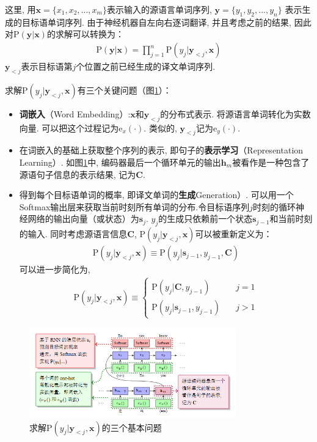 \documentclass[a4paper]{article}
\theoremstyle{definition}
\numberwithin{equation}{section}
\newcommand{\parinterval}{\noindent\hspace{2em}}%
\begin{document}
\noindent 这里, 用$\mathbf{x}=\{ x_1, x_2, ...,  x_m \}$表示输入的源语言单词序列, $\mathbf{y}=\{ y_1, y_2, ...,  y_n \}$ 表示生成的目标语单词序列. 由于神经机器自左向右逐词翻译, 并且考虑之前的结果, 因此对$\textrm{P} (\mathbf{y} | \mathbf{x})$的求解可以转换为：
\begin{eqnarray}
\textrm{P} (\mathbf{y} | \mathbf{x}) = \prod_{j=1}^{n} \textrm{P} ( y_j | \mathbf{y}_{<j },  \mathbf{x}  )
\end{eqnarray}
$ \mathbf{y}_{<j }$表示目标语第$j$个位置之前已经生成的译文单词序列. 

\parinterval 求解$\textrm{P}(y_j | \mathbf{y}_{<j}, \mathbf{x})$有三个关键问题（图\ref{fig:probquestion}）：

\begin{itemize}
\item	{\small\sffamily\bfseries{词嵌入}}（Word Embedding）:$\mathbf{x}$和$\mathbf{y}_{<j }$的分布式表示. 将源语言单词转化为实数向量. 可以把这个过程记为$\textrm{e}_x (\cdot)$. 类似的, $\mathbf{y}_{<j }$记为$\textrm{e}_y (\cdot)$. 
\item	在词嵌入的基础上获取整个序列的表示, 即句子的{\small\sffamily\bfseries{表示学习}}（Representation Learning）. 如图\ref{fig:probquestion}中, 编码器最后一个循环单元的输出$\mathbf{h}_m$被看作是一种包含了源语句子信息的表示结果, 记为$\mathbf{C}$. 
\item	得到每个目标语单词的概率, 即译文单词的{\small\sffamily\bfseries{生成}}Generation）. 可以用一个Softmax输出层来获取当前时刻所有单词的分布.令目标语序列$j$时刻的循环神经网络的输出向量（或状态）为$\mathbf{s}_j$. $ y_j$的生成只依赖前一个状态$\mathbf{s}_{j-1}$和当前时刻的输入. 同时考虑源语言信息$\mathbf{C}$, $\textrm{P}(y_j  | \mathbf{y}_{<j}, \mathbf{x})$可以被重新定义为：
\begin{eqnarray}
\textrm{P} (y_j | \mathbf{y}_{<j}, \mathbf{x}) \equiv \textrm{P} ( {y_j | \mathbf{s}_{j-1} , y_{j-1}, \mathbf{C}} )
\end{eqnarray}
可以进一步简化为, 
\begin{eqnarray}
\textrm{P} (y_j | \mathbf{y}_{<j}, \mathbf{x}) \equiv
 \left \{ \begin{array}{ll}
\textrm{P} (y_j |\mathbf{C} , y_{j-1}) &j=1 \\
\textrm{P} (y_j|\mathbf{s}_{j-1}, y_{j-1})  \quad &j>1
\end{array} \right . 
\end{eqnarray}
\end{itemize}

\begin{figure}[htp]
    \centering
     \includegraphics[width=0.8\textwidth]{RNNprobquestion.png}
    \caption{求解$\textrm{P} (y_j | \mathbf{y}_{<j}, \mathbf{x})$的三个基本问题}
    \label{fig:probquestion}
    \end{figure}
\end{document}
